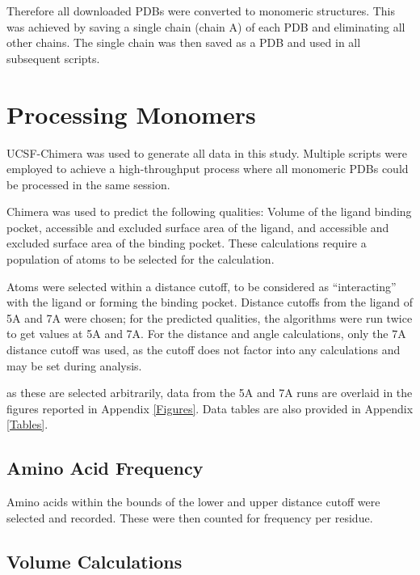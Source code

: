 \documentclass[a4paper, nobind]{templates/ociamthesis}
\begin{document}
Therefore all downloaded PDBs were converted to monomeric structures. This was achieved by saving a single chain (chain A) of each PDB and eliminating all other chains. The single chain was then saved as a PDB and used in all subsequent scripts.

\hypertarget{processing-monomers}{%
\section{Processing Monomers}\label{processing-monomers}}

UCSF-Chimera was used to generate all data in this study. Multiple scripts were employed to achieve a high-throughput process where all monomeric PDBs could be processed in the same session.

Chimera was used to predict the following qualities: Volume of the ligand binding pocket, accessible and excluded surface area of the ligand, and accessible and excluded surface area of the binding pocket. These calculations require a population of atoms to be selected for the calculation.

Atoms were selected within a distance cutoff, to be considered as ``interacting'' with the ligand or forming the binding pocket. Distance cutoffs from the ligand of 5A and 7A were chosen; for the predicted qualities, the algorithms were run twice to get values at 5A and 7A. For the distance and angle calculations, only the 7A distance cutoff was used, as the cutoff does not factor into any calculations and may be set during analysis.

as these are selected arbitrarily, data from the 5A and 7A runs are overlaid in the figures reported in Appendix \ref{Figures}. Data tables are also provided in Appendix \ref{Tables}.

\hypertarget{amino-acid-frequency}{%
\subsection{Amino Acid Frequency}\label{amino-acid-frequency}}

Amino acids within the bounds of the lower and upper distance cutoff were selected and recorded. These were then counted for frequency per residue.

\hypertarget{volume-calculations}{%
\subsection{Volume Calculations}\label{volume-calculations}}
\end{document}
